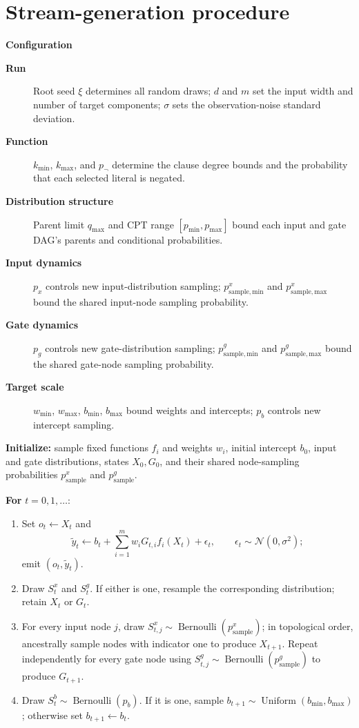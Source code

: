 \documentclass[11pt]{article}
\begin{document}
\section{Stream-generation procedure}
\noindent\textbf{Configuration}
\begin{description}
  \item[\textbf{Run}] Root seed $\xi$ determines all random draws; $d$ and
  $m$ set the input width and number of target components; $\sigma$ sets the
  observation-noise standard deviation.
  \item[\textbf{Function}] $k_{\min}$, $k_{\max}$, and $p_{\neg}$ determine
  the clause degree bounds and the probability that each selected literal is
  negated.
  \item[\textbf{Distribution structure}] Parent limit $q_{\max}$ and CPT
  range $[p_{\min},p_{\max}]$ bound each input and gate DAG's parents and
  conditional probabilities.
  \item[\textbf{Input dynamics}] $p_x$ controls new input-distribution
  sampling; $p_{\mathrm{sample,min}}^x$ and
  $p_{\mathrm{sample,max}}^x$ bound the shared input-node sampling
  probability.
  \item[\textbf{Gate dynamics}] $p_g$ controls new gate-distribution sampling;
  $p_{\mathrm{sample,min}}^g$ and $p_{\mathrm{sample,max}}^g$ bound the
  shared gate-node sampling probability.
  \item[\textbf{Target scale}] $w_{\min}$, $w_{\max}$, $b_{\min}$,
  $b_{\max}$ bound weights and intercepts; $p_b$ controls new intercept
  sampling.
\end{description}

\noindent\textbf{Initialize:} sample fixed functions $f_i$ and weights $w_i$,
initial intercept $b_0$, input and gate distributions, states $X_0,G_0$, and
their shared node-sampling probabilities $p_{\mathrm{sample}}^x$ and
$p_{\mathrm{sample}}^g$.

\noindent\textbf{For} $t=0,1,\ldots$:
\begin{enumerate}
  \item Set $o_t\gets X_t$ and
  \[
    \tilde y_t\gets b_t+\sum_{i=1}^m w_iG_{t,i}f_i(X_t)+\epsilon_t,
    \qquad \epsilon_t\sim\mathcal N(0,\sigma^2);
  \]
  emit $(o_t,\tilde y_t)$.
  \item Draw $S_t^x$ and $S_t^g$.  If either is one, resample the
  corresponding distribution; retain $X_t$ or $G_t$.
  \item For every input node $j$, draw
  $S_{t,j}^x\sim\operatorname{Bernoulli}(p_{\mathrm{sample}}^x)$; in
  topological order, ancestrally sample nodes with indicator one to produce
  $X_{t+1}$.  Repeat independently
  for every gate node using
  $S_{t,j}^g\sim\operatorname{Bernoulli}(p_{\mathrm{sample}}^g)$ to produce
  $G_{t+1}$.
  \item Draw $S_t^b\sim
  \operatorname{Bernoulli}(p_b)$.  If it is one,
  sample $b_{t+1}\sim\operatorname{Uniform}(b_{\min},b_{\max})$; otherwise
  set $b_{t+1}\gets b_t$.
\end{enumerate}
\end{document}
